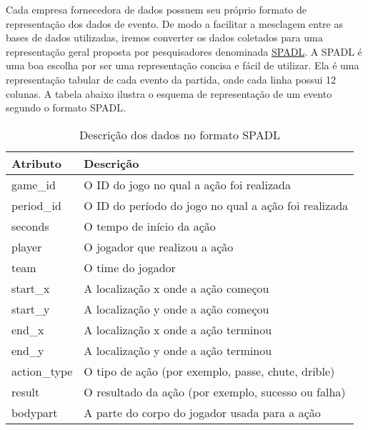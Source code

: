 \documentclass{article}
\begin{document}
Cada empresa fornecedora de dados possuem seu próprio formato de representação
dos dados de evento. De modo a facilitar a mesclagem entre as bases de dados
utilizadas, iremos converter os dados coletados para uma representação geral
proposta por pesquisadores denominada
\href{https://socceraction.readthedocs.io/en/latest/documentation/spadl/spadl.html}{SPADL}.
A SPADL é uma boa escolha por ser uma representação concisa e fácil de
utilizar. Ela é uma representação tabular de cada evento da partida, onde cada
linha possui 12 colunas. A tabela abaixo ilustra o esquema de representação de
um evento segundo o formato SPADL.

\begin{table}[H]
    \centering
    \begin{tabular}{|l|l|}
        \hline
        \textbf{Atributo} & \textbf{Descrição}
        \\
        \hline
        game\_id          & O ID do jogo no qual a ação foi realizada
        \\
        \hline
        period\_id        & O ID do período do jogo no qual a ação foi
        realizada
        \\
        \hline
        seconds           & O tempo de início da ação
        \\
        \hline
        player            & O jogador que realizou a ação
        \\
        \hline
        team              & O time do jogador
        \\
        \hline
        start\_x          & A localização x onde a ação começou
        \\
        \hline
        start\_y          & A localização y onde a ação começou
        \\
        \hline
        end\_x            & A localização x onde a ação terminou
        \\
        \hline
        end\_y            & A localização y onde a ação terminou
        \\
        \hline
        action\_type      & O tipo de ação (por exemplo, passe, chute, drible)
        \\
        \hline
        result            & O resultado da ação (por exemplo, sucesso ou falha)
        \\
        \hline
        bodypart          & A parte do corpo do jogador usada para a ação
        \\
        \hline
    \end{tabular}
    \caption{Descrição dos dados no formato SPADL}
\end{table}
\end{document}

